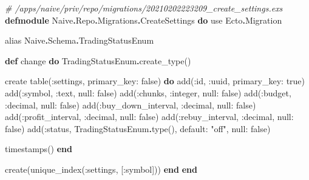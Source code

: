 \documentclass[
  oneside]{book}
\newenvironment{Shaded}{\begin{snugshade}}{\end{snugshade}}
\newcommand{\CommentTok}[1]{\textcolor[rgb]{0.56,0.35,0.01}{\textit{#1}}}
\newcommand{\ConstantTok}[1]{\textcolor[rgb]{0.00,0.00,0.00}{#1}}
\newcommand{\ImportTok}[1]{#1}
\newcommand{\KeywordTok}[1]{\textcolor[rgb]{0.13,0.29,0.53}{\textbf{#1}}}
\newcommand{\NormalTok}[1]{#1}
\newcommand{\OperatorTok}[1]{\textcolor[rgb]{0.81,0.36,0.00}{\textbf{#1}}}
\newcommand{\StringTok}[1]{\textcolor[rgb]{0.31,0.60,0.02}{#1}}
\newcommand{\VariableTok}[1]{\textcolor[rgb]{0.00,0.00,0.00}{#1}}
\begin{document}
\begin{Shaded}
\begin{Highlighting}[]
\CommentTok{\# /apps/naive/priv/repo/migrations/20210202223209\_create\_settings.exs}
\KeywordTok{defmodule} \ConstantTok{Naive}\OperatorTok{.}\ConstantTok{Repo}\OperatorTok{.}\ConstantTok{Migrations}\OperatorTok{.}\ConstantTok{CreateSettings} \KeywordTok{do}
  \ImportTok{use} \ConstantTok{Ecto}\OperatorTok{.}\ConstantTok{Migration}

  \ImportTok{alias} \ConstantTok{Naive}\OperatorTok{.}\ConstantTok{Schema}\OperatorTok{.}\ConstantTok{TradingStatusEnum}

  \KeywordTok{def}\NormalTok{ change }\KeywordTok{do}
    \ConstantTok{TradingStatusEnum}\OperatorTok{.}\NormalTok{create\_type()}

\NormalTok{    create table(}\VariableTok{:settings}\NormalTok{, }\VariableTok{primary\_key:} \ConstantTok{false}\NormalTok{) }\KeywordTok{do}
\NormalTok{      add(}\VariableTok{:id}\NormalTok{, }\VariableTok{:uuid}\NormalTok{, }\VariableTok{primary\_key:} \ConstantTok{true}\NormalTok{)}
\NormalTok{      add(}\VariableTok{:symbol}\NormalTok{, }\VariableTok{:text}\NormalTok{, }\VariableTok{null:} \ConstantTok{false}\NormalTok{)}
\NormalTok{      add(}\VariableTok{:chunks}\NormalTok{, }\VariableTok{:integer}\NormalTok{, }\VariableTok{null:} \ConstantTok{false}\NormalTok{)}
\NormalTok{      add(}\VariableTok{:budget}\NormalTok{, }\VariableTok{:decimal}\NormalTok{, }\VariableTok{null:} \ConstantTok{false}\NormalTok{)}
\NormalTok{      add(}\VariableTok{:buy\_down\_interval}\NormalTok{, }\VariableTok{:decimal}\NormalTok{, }\VariableTok{null:} \ConstantTok{false}\NormalTok{)}
\NormalTok{      add(}\VariableTok{:profit\_interval}\NormalTok{, }\VariableTok{:decimal}\NormalTok{, }\VariableTok{null:} \ConstantTok{false}\NormalTok{)}
\NormalTok{      add(}\VariableTok{:rebuy\_interval}\NormalTok{, }\VariableTok{:decimal}\NormalTok{, }\VariableTok{null:} \ConstantTok{false}\NormalTok{)}
\NormalTok{      add(}\VariableTok{:status}\NormalTok{, }\ConstantTok{TradingStatusEnum}\OperatorTok{.}\NormalTok{type(), }\VariableTok{default:} \StringTok{"off"}\NormalTok{, }\VariableTok{null:} \ConstantTok{false}\NormalTok{)}
      
\NormalTok{      timestamps()}
    \KeywordTok{end}

\NormalTok{    create(unique\_index(}\VariableTok{:settings}\NormalTok{, [}\VariableTok{:symbol}\NormalTok{]))}
  \KeywordTok{end}
\KeywordTok{end}
\end{Highlighting}
\end{Shaded}
\end{document}
